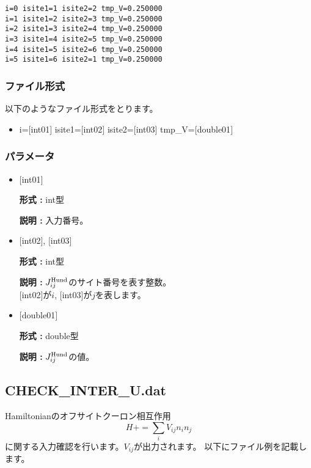 \begin{minipage}{12.5cm}
\begin{screen}
\begin{verbatim}
i=0 isite1=1 isite2=2 tmp_V=0.250000 
i=1 isite1=2 isite2=3 tmp_V=0.250000 
i=2 isite1=3 isite2=4 tmp_V=0.250000 
i=3 isite1=4 isite2=5 tmp_V=0.250000 
i=4 isite1=5 isite2=6 tmp_V=0.250000 
i=5 isite1=6 isite2=1 tmp_V=0.250000 
\end{verbatim}
\end{screen}
\end{minipage}

\subsubsection{ファイル形式}
以下のようなファイル形式をとります。
 \begin{itemize}
   \item  i=$[$int01$]$ isite1=$[$int02$]$ isite2=$[$int03$]$ tmp\_V=$[$double01$]$ 
 \end{itemize}
 
\subsubsection{パラメータ}
 \begin{itemize}

    \item  $[$int01$]$ 
   
    {\bf 形式 :} int型

   {\bf 説明 :} 入力番号。
      
   \item  $[$int02$]$, $[$int03$]$
   
    {\bf 形式 :} int型

    {\bf 説明 :}  $J_{ij}^{\rm Hund}$のサイト番号を表す整数。 \\
    $[$int02$]$が$i$, $[$int03$]$が$j$を表します。
 
   \item  $[$double01$]$ 
   
    {\bf 形式 :} double型

   {\bf 説明 :} $J_{ij}^{\rm Hund}$の値。
\end{itemize}

\newpage
\subsection{CHECK\_INTER\_U.dat}
Hamiltonianのオフサイトクーロン相互作用
\begin{equation}
H+=\sum_{i} V_{ij} n_{i} n_{j}
\end{equation}
に関する入力確認を行います。$V_{ij}$が出力されます。
以下にファイル例を記載します。

